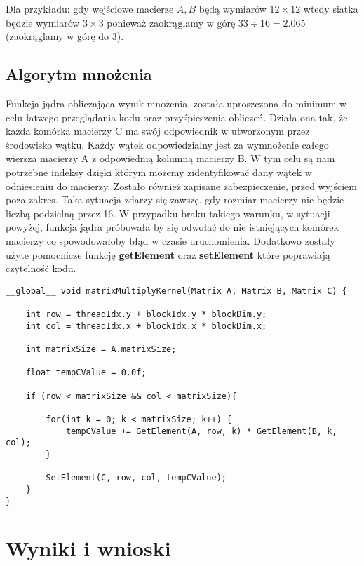 \documentclass[a4paper,12pt]{article}
\begin{document}
	 Dla przykładu: gdy wejściowe macierze \(A, B\) będą wymiarów \(12 \times 12\) wtedy siatka będzie wymiarów \( 3 \times 3 \) ponieważ zaokrąglamy w górę \(33 \div 16 = 2.065\) (zaokrąglamy w górę do 3).
	
	
	
\subsection*{Algorytm mnożenia}

Funkcja jądra obliczająca wynik mnożenia, została uproszczona do minimum w celu łatwego przeglądania kodu oraz przyśpieszenia obliczeń. 
Działa ona tak, że każda komórka macierzy C ma swój odpowiednik w utworzonym przez środowisko wątku.
 Każdy wątek odpowiedzialny jest za wymnożenie całego wiersza macierzy A z odpowiednią kolumną macierzy B.
W tym celu są nam potrzebne indeksy dzięki którym możemy zidentyfikować dany wątek w odniesieniu do macierzy.
 Zostało również zapisane zabezpieczenie, przed wyjściem poza zakres. 
 Taka sytuacja zdarzy się zawszę, gdy rozmiar macierzy nie będzie liczbą podzielną przez 16. 
W przypadku braku takiego warunku, w sytuacji powyżej, funkcja jądra próbowała by się odwołać do nie istniejących komórek macierzy co spowodowałoby błąd w czasie uruchomienia. 
Dodatkowo zostały użyte pomocnicze funkcję \textbf{getElement} oraz \textbf{setElement} które poprawiają czytelność kodu.


\begin{lstlisting}[caption=Główna funkcja jądra GPU - Mnożenie macierzy.=GPU_KERNEL] 
__global__ void matrixMultiplyKernel(Matrix A, Matrix B, Matrix C) {

	int row = threadIdx.y + blockIdx.y * blockDim.y;
	int col = threadIdx.x + blockIdx.x * blockDim.x;

	int matrixSize = A.matrixSize;

	float tempCValue = 0.0f;

	if (row < matrixSize && col < matrixSize){

		for(int k = 0; k < matrixSize; k++) {
			tempCValue += GetElement(A, row, k) * GetElement(B, k, col);
		}

		SetElement(C, row, col, tempCValue);
	}
}
\end{lstlisting}

\section*{Wyniki i wnioski}
\end{document}
